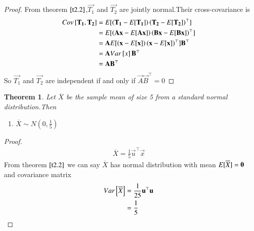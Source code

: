 \documentclass[journal,12pt,twocolumn]{IEEEtran}
\newtheorem{theorem}{Theorem}[section]
\begin{document}
\begin{proof}
From theorem $\ref{t2.2}$,$\vec{T_1}$ and $\vec{T_2}$ are jointly normal.Their cross-covariance is
\begin{align}
    Cov{}\left[\mathbf{T_1},\mathbf{T_2}\right]&=E[ \left(\mathbf{T_1}-E[ \mathbf{T_1} ]\right)\left(\mathbf{T_2}-E[ \mathbf{T_2} ]\right)^{\top} ]\\
    &=E[ \left(\mathbf{A}\mathbf{x}-E[ \mathbf{A}\mathbf{x} ]\right)\left(\mathbf{B}\mathbf{x}-E[ \mathbf{B}\mathbf{x} ]\right)^{\top} ]\\
    &=\mathbf{A}E[ \left(\mathbf{x}-E[ \mathbf{x} ]\right)\left(\mathbf{x}-E[ \mathbf{x} ]\right)^{\top} ]\mathbf{B}^{\top}\\
    &=\mathbf{A}Var{}\left[x\right]\mathbf{B}^{\top}\\
    &=\mathbf{A}\mathbf{B}^{\top}
\end{align}
So $\vec{T_1}$ and $\vec{T_2}$ are independent if and only if $\vec{A}\vec{B}^{\top}=0$
\end{proof}
\begin{theorem}
Let $\overline{X}$ be the sample mean of size 5 from a standard normal distribution.Then
\begin{enumerate}
    \item $\overline{X} \sim N(0,\frac{1}{5})$
\end{enumerate} 
\end{theorem}
\begin{proof}

\begin{align}
    \overline{X}=\frac{1}{5}\vec{u}^{\top}\vec{x}\label{3.1}
\end{align}
From theorem $\ref{t2.2}$ we can say $\overline{X}$ has normal distribution with mean $E[ \overline{X} ]=\mathbf{0}$ and covariance matrix
\begin{align}
    Var{}\left[\overline{X}\right]&=\frac{1}{25}\mathbf{u}^{\top}\mathbf{u}\\
    &=\frac{1}{5}
\end{align}

\end{proof}
\end{document}
